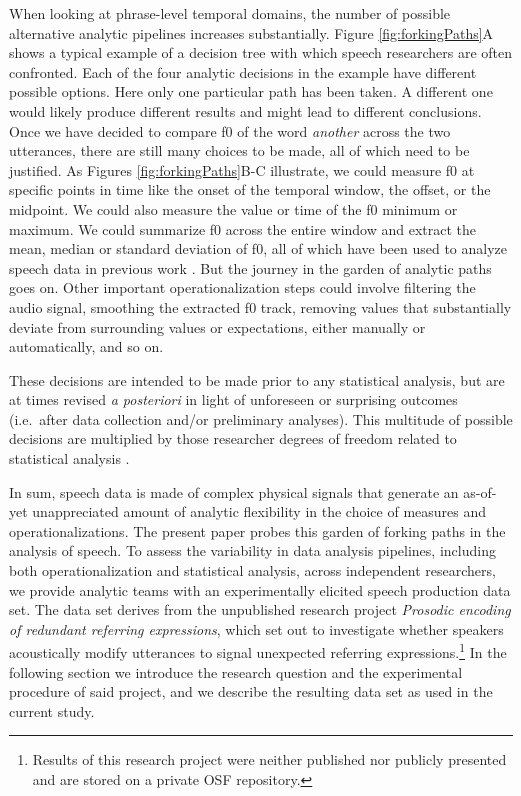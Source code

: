 \documentclass[Review,times,sageh]{sagej}
\begin{document}
When looking at phrase-level temporal domains, the number of possible alternative analytic pipelines increases substantially.
Figure \ref{fig:forkingPaths}A shows a typical example of a decision tree with which speech researchers are often confronted.
Each of the four analytic decisions in the example have different possible options.
Here only one particular path has been taken. A different one would likely produce different results and might lead to different conclusions.
Once we have decided to compare f0 of the word \emph{another} across the two utterances, there are still many choices to be made, all of which need to be justified.
As Figures \ref{fig:forkingPaths}B-C illustrate, we could measure f0 at specific points in time like the onset of the temporal window, the offset, or the midpoint.
We could also measure the value or time of the f0 minimum or maximum.
We could summarize f0 across the entire window and extract the mean, median or standard deviation of f0, all of which have been used to analyze speech data in previous work \citep[see][]{gordon2017acoustic}.
But the journey in the garden of analytic paths goes on.
Other important operationalization steps could involve filtering the audio signal, smoothing the extracted f0 track, removing values that substantially deviate from surrounding values or expectations, either manually or automatically, and so on.

These decisions are intended to be made prior to any statistical analysis, but are at times revised \emph{a posteriori} in light of unforeseen or surprising outcomes (i.e.~after data collection and/or preliminary analyses).
This multitude of possible decisions are multiplied by those researcher degrees of freedom related to statistical analysis \citep[e.g.][]{wicherts2016}.

In sum, speech data is made of complex physical signals that generate an as-of-yet unappreciated amount of analytic flexibility in the choice of measures and operationalizations.
The present paper probes this garden of forking paths in the analysis of speech.
To assess the variability in data analysis pipelines, including both operationalization and statistical analysis, across independent researchers, we provide analytic teams with an experimentally elicited speech production data set.
The data set derives from the unpublished research project \emph{Prosodic encoding of redundant referring expressions}, which set out to investigate whether speakers acoustically modify utterances to signal unexpected referring expressions.\footnote{Results of this research project were neither published nor publicly presented and are stored on a private OSF repository.}
In the following section we introduce the research question and the experimental procedure of said project, and we describe the resulting data set as used in the current study.
\end{document}
